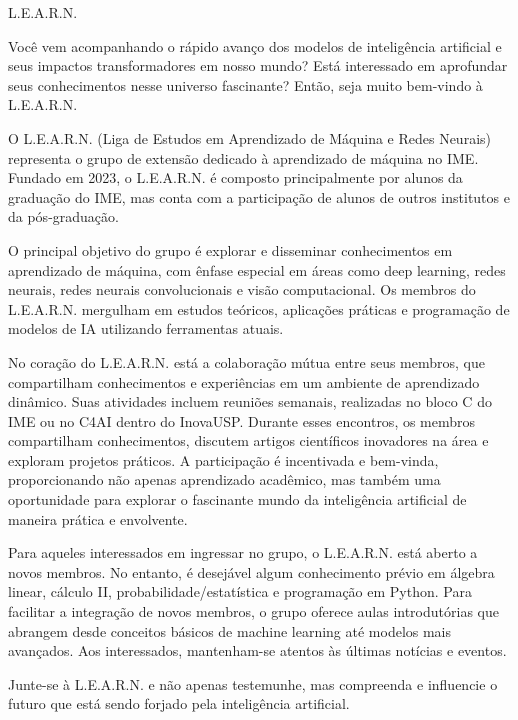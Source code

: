 \begin{subsecao}{L.E.A.R.N.}


Você vem acompanhando o rápido avanço dos modelos de inteligência artificial e seus 
impactos transformadores em nosso mundo? Está interessado em aprofundar seus 
conhecimentos nesse universo fascinante? Então, seja muito bem-vindo à L.E.A.R.N.

O L.E.A.R.N. (Liga de Estudos em Aprendizado de Máquina e Redes Neurais) representa 
o grupo de extensão dedicado à aprendizado de máquina no IME. Fundado em 2023, o 
L.E.A.R.N. é composto principalmente por alunos da graduação do IME, mas conta com 
a participação de alunos de outros institutos e da pós-graduação.

O principal objetivo do grupo é explorar e disseminar conhecimentos em aprendizado 
de máquina, com ênfase especial em áreas como deep learning, redes neurais, redes 
neurais convolucionais e visão computacional. Os membros do L.E.A.R.N. mergulham em 
estudos teóricos, aplicações práticas e programação de modelos de IA utilizando 
ferramentas atuais.

No coração do L.E.A.R.N. está a colaboração mútua entre seus membros, que 
compartilham conhecimentos e experiências em um ambiente de aprendizado dinâmico. 
Suas atividades incluem reuniões semanais, realizadas no bloco C do IME ou no C4AI 
dentro do InovaUSP. Durante esses encontros, os membros compartilham conhecimentos, 
discutem artigos científicos inovadores na área e exploram projetos práticos. A 
participação é incentivada e bem-vinda, proporcionando não apenas aprendizado 
acadêmico, mas também uma oportunidade para explorar o fascinante mundo da 
inteligência artificial de maneira prática e envolvente. 

Para aqueles interessados em ingressar no grupo, o L.E.A.R.N. está aberto a novos 
membros. No entanto, é desejável algum conhecimento prévio em álgebra linear, 
cálculo II, probabilidade/estatística e programação em Python. Para facilitar a 
integração de novos membros, o grupo oferece aulas introdutórias que abrangem desde 
conceitos básicos de machine learning até modelos mais avançados. Aos interessados, 
mantenham-se atentos às últimas notícias e eventos.

Junte-se à L.E.A.R.N. e não apenas testemunhe, mas compreenda e influencie o futuro 
que está sendo forjado pela inteligência artificial.

\end{subsecao}

